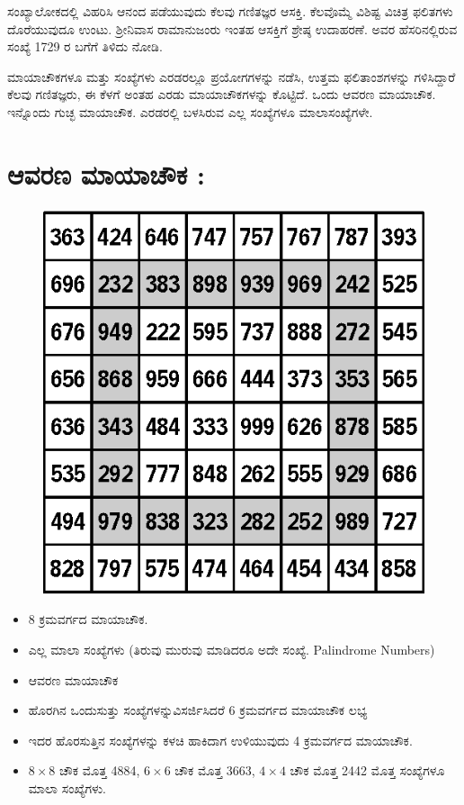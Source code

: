 ಸಂಖ್ಯಾಲೋಕದಲ್ಲಿ ವಿಹರಿಸಿ ಆನಂದ ಪಡೆಯುವುದು ಕೆಲವು ಗಣಿತಜ್ಞರ ಆಸಕ್ತಿ. ಕೆಲವೊಮ್ಮೆ ವಿಶಿಷ್ಟ ವಿಚಿತ್ರ ಫಲಿತಗಳು ದೊರೆಯುವುದೂ ಉಂಟು. ಶ್ರೀನಿವಾಸ ರಾಮಾನುಜಂರು ಇಂತಹ ಆಸಕ್ತಿಗೆ ಶ್ರೇಷ್ಠ ಉದಾಹರಣೆ. ಅವರ ಹೆಸರಿನಲ್ಲಿರುವ ಸಂಖ್ಯೆ 1729 ರ ಬಗೆಗೆ ತಿಳಿದು ನೋಡಿ.

ಮಾಯಾಚೌಕಗಳೂ ಮತ್ತು ಸಂಖ್ಯೆಗಳು ಎರಡರಲ್ಲೂ ಪ್ರಯೋಗಗಳನ್ನು ನಡೆಸಿ, ಉತ್ತಮ ಫಲಿತಾಂಶಗಳನ್ನು ಗಳಿಸಿದ್ದಾರೆ ಕೆಲವು ಗಣಿತಜ್ಞರು, ಈ ಕೆಳಗೆ ಅಂತಹ ಎರಡು ಮಾಯಾಚೌಕಗಳನ್ನು ಕೊಟ್ಟಿದೆ. ಒಂದು ಆವರಣ ಮಾಯಾಚೌಕ. ಇನ್ನೊಂದು ಗುಚ್ಛ ಮಾಯಾಚೌಕ. ಎರಡರಲ್ಲಿ ಬಳಸಿರುವ ಎಲ್ಲ ಸಂಖ್ಯೆಗಳೂ ಮಾಲಾಸಂಖ್ಯೆಗಳೇ.

\section*{ಆವರಣ ಮಾಯಾಚೌಕ :}

\begin{figure}[H]
\includegraphics{src/figures/chap5/fig5-14.eps}
\end{figure}

\begin{itemize}
	\item 8 ಕ್ರಮವರ್ಗದ ಮಾಯಾಚೌಕ.
	\item ಎಲ್ಲ ಮಾಲಾ ಸಂಖ್ಯೆಗಳು (ತಿರುವು ಮುರುವು ಮಾಡಿದರೂ ಅದೇ ಸಂಖ್ಯೆ. Palindrome Numbers)
	\item ಆವರಣ ಮಾಯಾಚೌಕ
	\item ಹೊರಗಿನ ಒಂದುಸುತ್ತು ಸಂಖ್ಯೆಗಳನ್ನುವಿಸರ್ಜಿಸಿದರೆ 6 ಕ್ರಮವರ್ಗದ ಮಾಯಾಚೌಕ ಲಭ್ಯ
	\item ಇದರ ಹೊರಸುತ್ತಿನ ಸಂಖ್ಯೆಗಳನ್ನು ಕಳಚಿ ಹಾಕಿದಾಗ ಉಳಿಯುವುದು 4 ಕ್ರಮವರ್ಗದ ಮಾಯಾಚೌಕ.
	\item $8 \times 8$ ಚೌಕ ಮೊತ್ತ 4884, $6 \times 6$ ಚೌಕ ಮೊತ್ತ 3663, $4 \times 4$ ಚೌಕ ಮೊತ್ತ 2442 ಮೊತ್ತ ಸಂಖ್ಯೆಗಳೂ ಮಾಲಾ ಸಂಖ್ಯೆಗಳು.
\end{itemize}

